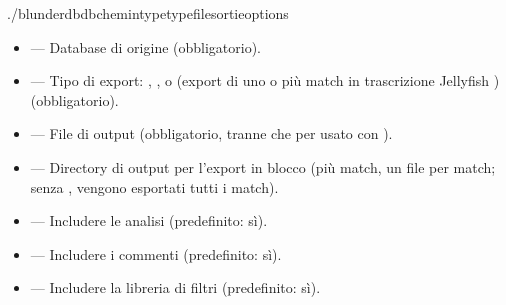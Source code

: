 \documentclass[letterpaper,10pt,italian]{sphinxmanual}
\begin{document}
\begin{sphinxVerbatim}[commandchars=\\\{\}]
./blunderdb\PYGZhy{}\PYGZhy{}db\PYGZlt{}chemin\PYGZgt{}\PYGZhy{}\PYGZhy{}type\PYGZlt{}type\PYGZgt{}\PYGZhy{}\PYGZhy{}file\PYGZlt{}sortie\PYGZgt{}\PYG{o}{[}options\PYG{o}{]}
\end{sphinxVerbatim}

\sphinxAtStartPar
{}
\begin{itemize}
\item {} 
\sphinxAtStartPar
{} — Database di origine (obbligatorio).

\item {} 
\sphinxAtStartPar
{} — Tipo di export: , ,  o  (export di uno o più match in trascrizione Jellyfish ) (obbligatorio).

\item {} 
\sphinxAtStartPar
{} — File di output (obbligatorio, tranne che per  usato con ).

\item {} 
\sphinxAtStartPar
{} — Directory di output per l’export  in blocco (più match, un file per match; senza , vengono esportati tutti i match).

\item {} 
\sphinxAtStartPar
{} — Includere le analisi (predefinito: sì).

\item {} 
\sphinxAtStartPar
{} — Includere i commenti (predefinito: sì).

\item {} 
\sphinxAtStartPar
{} — Includere la libreria di filtri (predefinito: sì).


\end{itemize}
\end{document}
